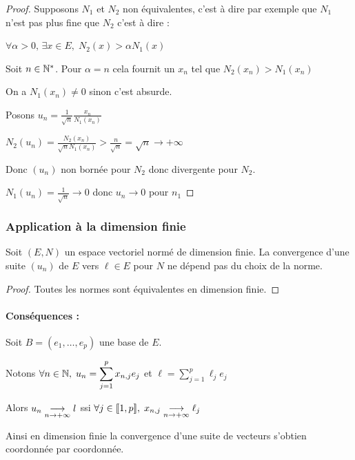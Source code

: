 \begin{proof}
    Supposons $N_1$ et $N_2$ non équivalentes, c'est à dire par exemple que $N_1$ n'est pas plus 
    fine que $N_2$ c'est à dire : 

    $\forall \alpha >0, \, \exists x \in E, \; N_2(x) > \alpha N_1(x)$

    Soit $n \in \mathbb{N}^*$. Pour $\alpha = n$ cela fournit un $x_n$ tel que $N_2(x_n) > N_1(x_n)$

    On a $N_1(x_n) \neq 0$ sinon c'est absurde.

    Posons $\displaystyle u_n = \frac 1 {\sqrt n}\frac{x_n}{N_1(x_n)}$

    $\displaystyle N_2(u_n) = \frac{N_2(x_n)}{\sqrt n N_1(x_n)} > \frac n {\sqrt n} = \sqrt n \to + \infty$

    Donc $(u_n)$ non bornée pour $N_2$ donc divergente pour $N_2$. 

    $N_1(u_n) =  \frac 1 {\sqrt n} \to 0$ donc $u_n \to 0$ pour $n_1$
\end{proof}

\subsubsection{Application à la dimension finie}

\begin{theoreme}{}{}
    Soit $(E, N)$ un espace vectoriel normé de dimension finie. La convergence d'une suite $(u_n)$ de $E$
    vers $\ell \in E$ pour $N$ ne dépend pas du choix de la norme. 
\end{theoreme}

\begin{proof}
    Toutes les normes sont équivalentes en dimension finie. 
\end{proof}

\paragraph{Conséquences :}

Soit $B = (e_1, \dots, e_p)$ une base de $E$.

Notons $\displaystyle  \forall n \in \mathbb{N}, \; u_n = \sum_{j = 1}^{p} x_{n, j} e_j$
et $\displaystyle \ell = \sum_{j = 1}^{p} \ell_j e_j$

Alors $u_n \underset{n \to + \infty}{\longrightarrow} l$ ssi $\forall j \in [\![1, p]\!], \; x_{n, j} \underset{n \to + \infty}{\longrightarrow} \ell_j$

Ainsi en dimension finie la convergence d'une suite de vecteurs s'obtien coordonnée par coordonnée. 


